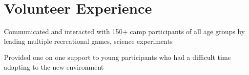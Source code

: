 \documentclass[]{morris-cv}
\begin{document}
\begin{minipage}[t]{0.67\textwidth}

\section{Volunteer Experience}
\begin{tightemize}
    \item Communicated and interacted with 150+ camp participants of all age groups by leading multiple recreational games, science experiments
    \item Provided one on one support to young participants who had a difficult time adapting to the new environment
\end{tightemize}
\sectionsep
\end{minipage} 
\end{document}
